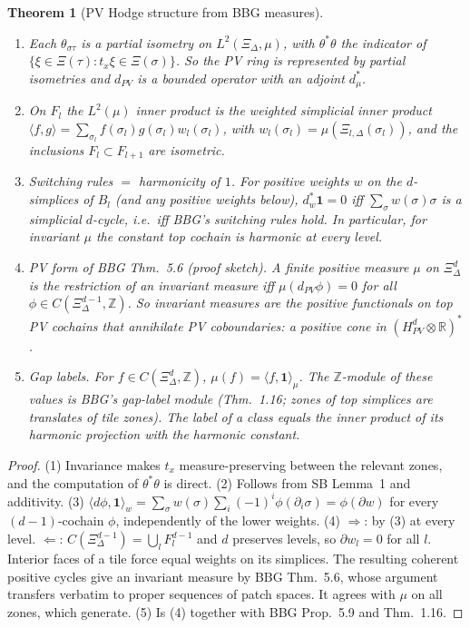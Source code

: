 \documentclass[11pt]{article}
\newtheorem{theorem}{Theorem}[section]
\theoremstyle{definition}
\theoremstyle{remark}
\newcommand{\Z}{\mathbb Z}
\newcommand{\R}{\mathbb R}
\begin{document}
\begin{theorem}[PV Hodge structure from BBG measures]\label{thm:pvhodge}
\begin{enumerate}
\item Each $\theta_{\sigma\tau}$ is a partial isometry on $L^2(\Xi_\Delta,\mu)$, with $\theta^*\theta$ the indicator of $\{\xi\in\Xi(\tau):t_x\xi\in\Xi(\sigma)\}$. So the PV ring is represented by partial isometries and $d_{PV}$ is a bounded operator with an adjoint $d^*_\mu$.
\item On $F_l$ the $L^2(\mu)$ inner product is the weighted simplicial inner product $\langle f,g\rangle=\sum_{\sigma_l}f(\sigma_l)g(\sigma_l)w_l(\sigma_l)$, with $w_l(\sigma_l)=\mu(\Xi_{l,\Delta}(\sigma_l))$, and the inclusions $F_l\subset F_{l+1}$ are isometric.
\item \emph{Switching rules $=$ harmonicity of $1$.} For positive weights $w$ on the $d$-simplices of $B_l$ (and any positive weights below), $d^*_w\mathbf 1=0$ iff $\sum_\sigma w(\sigma)\sigma$ is a simplicial $d$-cycle, i.e.\ iff BBG's switching rules hold. In particular, for invariant $\mu$ the constant top cochain is harmonic at every level.
\item \emph{PV form of BBG Thm.~5.6 (proof sketch).} A finite positive measure $\mu$ on $\Xi^d_\Delta$ is the restriction of an invariant measure iff $\mu(d_{PV}\phi)=0$ for all $\phi\in C(\Xi^{d-1}_\Delta,\Z)$. So invariant measures are the positive functionals on top PV cochains that annihilate PV coboundaries: a positive cone in $(H^d_{PV}\otimes\R)^*$.
\item \emph{Gap labels.} For $f\in C(\Xi^d_\Delta,\Z)$, $\mu(f)=\langle f,\mathbf1\rangle_\mu$. The $\Z$-module of these values is BBG's gap-label module (Thm.~1.16; zones of top simplices are translates of tile zones). The label of a class equals the inner product of its harmonic projection with the harmonic constant.
\end{enumerate}
\end{theorem}

\begin{proof}
(1) Invariance makes $t_x$ measure-preserving between the relevant zones, and the computation of $\theta^*\theta$ is direct. (2) Follows from SB Lemma~1 and additivity. (3) $\langle d\phi,\mathbf1\rangle_w=\sum_\sigma w(\sigma)\sum_i(-1)^i\phi(\partial_i\sigma)=\phi(\partial w)$ for every $(d-1)$-cochain $\phi$, independently of the lower weights.
(4) $\Rightarrow$: by (3) at every level. $\Leftarrow$: $C(\Xi^{d-1}_\Delta)=\bigcup_lF_l^{d-1}$ and $d$ preserves levels, so $\partial w_l=0$ for all $l$. Interior faces of a tile force equal weights on its simplices. The resulting coherent positive cycles give an invariant measure by BBG Thm.~5.6, whose argument transfers verbatim to proper sequences of patch spaces. It agrees with $\mu$ on all zones, which generate.
(5) Is (4) together with BBG Prop.~5.9 and Thm.~1.16.
\end{proof}
\end{document}

